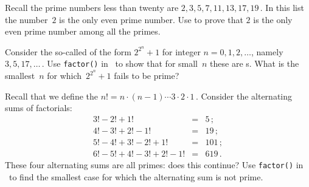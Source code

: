 \begin{draft}
\begin{exercise}  
Recall the prime numbers less than twenty are \(2,3,5,7,11,13,17,19\)\,.
In this list the number~\(2\) is the only even prime number.
Use  to prove that \(2\) is the only even prime number among all the primes.
\end{exercise}



\begin{exercise}  
Consider the so-called  of the form \(2^{2^n}+1\) for integer \(n=0,1,2,\ldots\), namely \(3,5,17,\ldots\)\,.  
Use \verb|factor()| in \script\ to show that for small~\(n\) these are s.
What is the smallest~\(n\) for which~\(2^{2^n}+1\) fails to be prime?
\end{exercise}


\begin{exercise}  
Recall that we define the  \(n!=n\cdot(n-1)\cdots3\cdot2\cdot1\)\,.
Consider the alternating sums of factorials:
\begin{eqnarray*}
3!-2!+1!&=&5\,;\\
4!-3!+2!-1!&=&19\,;\\
5!-4!+3!-2!+1!&=&101\,;\\
6!-5!+4!-3!+2!-1!&=&619\,.
\end{eqnarray*}
These four alternating sums are all primes: does this continue?
Use \verb|factor()| in \script\ to find the smallest case for which the alternating sum is not prime.
\end{exercise}



\end{draft}
